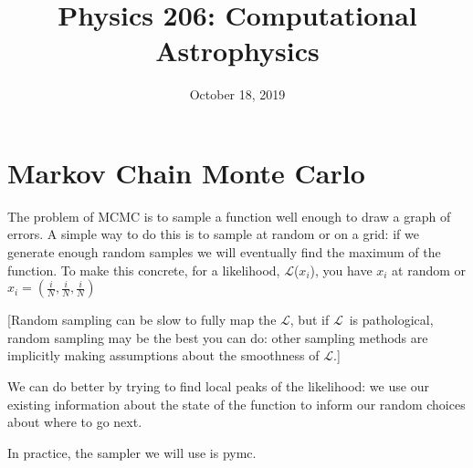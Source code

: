 \documentclass{article}
\title{Physics 206: Computational Astrophysics}
\date{October 18, 2019}
\newcommand{\Lc}{$\mathcal{L}$}
\begin{document}
\maketitle

\section{Markov Chain Monte Carlo}

The problem of MCMC is to sample a function well enough to draw a graph of errors. A simple way to do this is to sample at random or on a grid: if we generate enough random samples we will eventually find the maximum of the function. To make this concrete, for a likelihood, \Lc($x_{i}$), you have $x_{i}$ at random or $x_{i} = (\frac{i}{N}, \frac{i}{N}, \frac{i}{N})$

[Random sampling can be slow to fully map the \Lc, but if \Lc\ is pathological, random sampling may be the best you can do: other sampling methods are implicitly making assumptions about the smoothness of \Lc.]

We can do better by trying to find local peaks of the likelihood: we use our existing information about the state of the function to inform our random choices about where to go next.

\medskip

\noindent In practice, the sampler we will use is pymc.

\medskip
\end{document}
